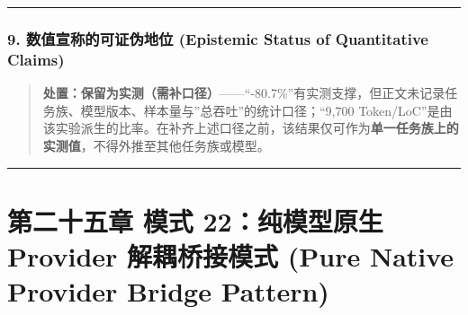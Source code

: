 \documentclass[
]{ctexart}
\newenvironment{Shaded}{}{}
\newcommand{\AttributeTok}[1]{\textcolor[rgb]{0.49,0.56,0.16}{#1}}
\newcommand{\BuiltInTok}[1]{\textcolor[rgb]{0.00,0.50,0.00}{#1}}
\newcommand{\CommentTok}[1]{\textcolor[rgb]{0.38,0.63,0.69}{\textit{#1}}}
\newcommand{\ControlFlowTok}[1]{\textcolor[rgb]{0.00,0.44,0.13}{\textbf{#1}}}
\newcommand{\FunctionTok}[1]{\textcolor[rgb]{0.02,0.16,0.49}{#1}}
\newcommand{\KeywordTok}[1]{\textcolor[rgb]{0.00,0.44,0.13}{\textbf{#1}}}
\newcommand{\NormalTok}[1]{#1}
\newcommand{\OperatorTok}[1]{\textcolor[rgb]{0.40,0.40,0.40}{#1}}
\newcommand{\SpecialCharTok}[1]{\textcolor[rgb]{0.25,0.44,0.63}{#1}}
\newcommand{\VerbatimStringTok}[1]{\textcolor[rgb]{0.25,0.44,0.63}{#1}}
\renewcommand{\_}{\discretionary{}{}{\textunderscore}}
\let\oldsection\section
\renewcommand{\section}{\clearpage\oldsection}
\begin{document}
\begin{Shaded}
\end{Shaded}

\begin{center}\rule{0.5\linewidth}{0.5pt}\end{center}

\subsubsection{9. 数值宣称的可证伪地位 (Epistemic Status of Quantitative
Claims)}\label{ux6570ux503cux5ba3ux79f0ux7684ux53efux8bc1ux4f2aux5730ux4f4d-epistemic-status-of-quantitative-claims-6}

\begin{quote}
\textbf{处置：保留为实测（需补口径）}------``-80.7\%''有实测支撑，但正文未记录任务族、模型版本、样本量与''总吞吐''的统计口径；``9,700
Token/LoC''是由该实验派生的比率。在补齐上述口径之前，该结果仅可作为\textbf{单一任务族上的实测值}，不得外推至其他任务族或模型。
\end{quote}

\begin{center}\rule{0.5\linewidth}{0.5pt}\end{center}

\section{第二十五章 模式 22：纯模型原生 Provider 解耦桥接模式 (Pure Native Provider
Bridge
Pattern)}\label{ux6a21ux5f0f-22ux7eafux6a21ux578bux539fux751f-provider-ux89e3ux8026ux6865ux63a5ux6a21ux5f0f-pure-native-provider-bridge-pattern}
\end{document}
